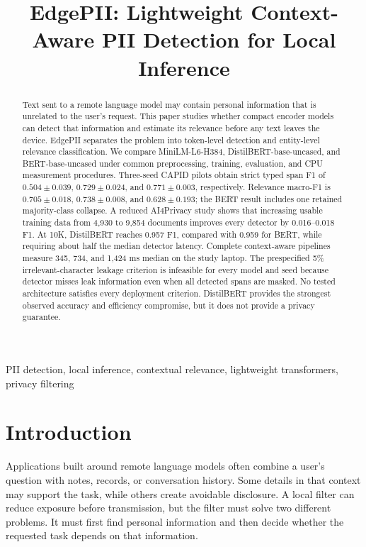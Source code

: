 \documentclass[conference]{IEEEtran}
\title{EdgePII: Lightweight Context-Aware PII Detection for Local Inference}
\author{
\IEEEauthorblockN{Vasishta Nandipati, Karthikeya Davasam, and Tirth Koradia}
\IEEEauthorblockA{Manipal Institute of Technology\\Manipal, India}
}
\begin{document}
\maketitle

\begin{abstract}
Text sent to a remote language model may contain personal information that is unrelated to the user's request. This paper studies whether compact encoder models can detect that information and estimate its relevance before any text leaves the device. EdgePII separates the problem into token-level detection and entity-level relevance classification. We compare MiniLM-L6-H384, DistilBERT-base-uncased, and BERT-base-uncased under common preprocessing, training, evaluation, and CPU measurement procedures. Three-seed CAPID pilots obtain strict typed span F1 of $0.504\pm0.039$, $0.729\pm0.024$, and $0.771\pm0.003$, respectively. Relevance macro-F1 is $0.705\pm0.018$, $0.738\pm0.008$, and $0.628\pm0.193$; the BERT result includes one retained majority-class collapse. A reduced AI4Privacy study shows that increasing usable training data from 4,930 to 9,854 documents improves every detector by 0.016--0.018 F1. At 10K, DistilBERT reaches 0.957 F1, compared with 0.959 for BERT, while requiring about half the median detector latency. Complete context-aware pipelines measure 345, 734, and 1,424 ms median on the study laptop. The prespecified 5\% irrelevant-character leakage criterion is infeasible for every model and seed because detector misses leak information even when all detected spans are masked. No tested architecture satisfies every deployment criterion. DistilBERT provides the strongest observed accuracy and efficiency compromise, but it does not provide a privacy guarantee.
\end{abstract}

\begin{IEEEkeywords}
PII detection, local inference, contextual relevance, lightweight transformers, privacy filtering
\end{IEEEkeywords}

\section{Introduction}
Applications built around remote language models often combine a user's question with notes, records, or conversation history. Some details in that context may support the task, while others create avoidable disclosure. A local filter can reduce exposure before transmission, but the filter must solve two different problems. It must first find personal information and then decide whether the requested task depends on that information.
\end{document}
